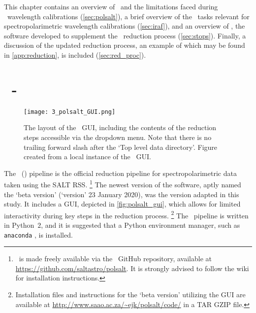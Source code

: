 
This chapter contains an overview of \polsalt\ and the limitations faced during \polsalt\ wavelength calibrations (\autoref{sec:polsalt}), a brief overview of the \iraf\ tasks relevant for spectropolarimetric wavelength calibrations (\autoref{sec:iraf}), and an overview of \stops, the software developed to supplement the \polsalt\ reduction process (\autoref{sec:stops}). Finally, a discussion of the updated reduction process, an example of which may be found in \autoref{app:reduction}, is included (\autoref{sec:red_proc}).

\section[\textsc{polsalt}]{\polsalt\ - } \label{sec:polsalt}

\begin{figure}[t]
    \centering
    \texttt{[image: 3\_polsalt\_GUI.png]}
    \caption{The layout of the \polsalt\ \gls{GUI}, including the contents of the reduction steps accessible via the dropdown menu. Note that there is no trailing forward slash after the `Top level data directory'. Figure created from a local instance of the \polsalt\ \gls{GUI}.}
    \label{fig:polsalt_gui}
\end{figure}

The \polsalt\ () pipeline is the official reduction pipeline for spectropolarimetric data taken using the \gls{SALT} \gls{RSS}.%
\footnote{\polsalt\ is made freely available via the \polsalt\ GitHub repository, available at \url{https://github.com/saltastro/polsalt}. It is strongly advised to follow the wiki for installation instructions.}
The newest version of the software, aptly named the `beta version' (`version' 23 January 2020), was the version adapted in this study. It includes a \gls{GUI}, depicted in \autoref{fig:polsalt_gui}, which allows for limited interactivity during key steps in the reduction process.%
\footnote{Installation files and instructions for the `beta version' utilizing the \gls{GUI} are available at \url{http://www.saao.ac.za/~ejk/polsalt/code/} in a TAR GZIP file.}
The \polsalt\ pipeline is written in Python~$2$, and it is suggested that a Python environment manager, such as \texttt{anaconda} \citep{anaconda}, is installed.

